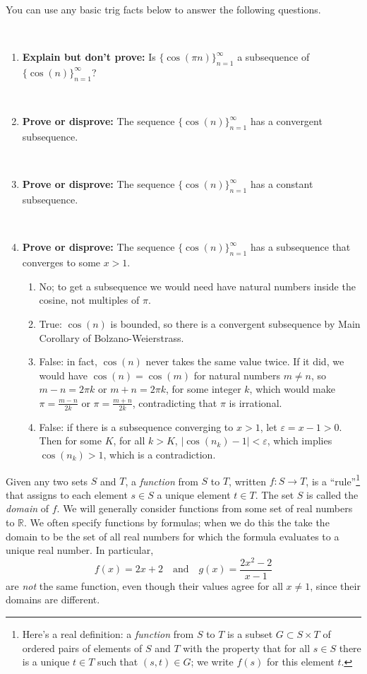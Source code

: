 \documentclass[12pt]{amsart}
\def\e{\varepsilon}
\newcommand{\R}{{\mathbb{R}}}
\numberwithin{equation}{section}
\theoremstyle{plain} %
\theoremstyle{definition}
\theoremstyle{remark}
\begin{document}
You can use any basic trig facts below to answer the following questions. 

\

\begin{enumerate}
\item \textbf{Explain but don't prove:} Is $\{ \cos( \pi n) \}_{n=1}^\infty$ a subsequence of $\{ \cos(n) \}_{n=1}^\infty$?

\

\item \textbf{Prove or disprove:} The sequence $\{ \cos(n) \}_{n=1}^\infty$ has a convergent subsequence.

\

\item \textbf{Prove or disprove:} The sequence $\{ \cos(n) \}_{n=1}^\infty$ has a constant subsequence.

\

\item \textbf{Prove or disprove:} The sequence $\{ \cos(n) \}_{n=1}^\infty$ has a subsequence that converges to some $x>1$.

\begin{framed}
\begin{enumerate}
\item No; to get a subsequence we would need have natural numbers inside the cosine, not multiples of $\pi$.
\item True: $\cos(n)$ is bounded, so there is a convergent subsequence by Main Corollary of Bolzano-Weierstrass.
\item False: in fact, $\cos(n)$ never takes the same value twice. If it did, we would have $\cos(n)=\cos(m)$ for natural numbers $m\neq n$, so $m-n= 2\pi k$ or $m+n= 2\pi k$, for some integer $k$, which would make $\pi = \frac{m-n}{2k}$ or $\pi = \frac{m+n}{2k}$, contradicting that $\pi$ is irrational.
\item False: if there is a subsequence converging to $x>1$, let $\e= x-1 >0$. Then for some $K$, for all $k>K$, $|\cos(n_k) -1|<\e$, which implies $\cos(n_k) >1$, which is a contradiction.
\end{enumerate}
\end{framed}
\end{enumerate}

	
Given any two sets $S$ and $T$, a \emph{function} from $S$ to $T$, written $f: S\to T$, is a ``rule''\footnote{Here's a real definition: a \emph{function} from $S$ to $T$ is a subset $G\subset S\times T$ of ordered pairs of elements of $S$ and $T$ with the property that for all $s\in S$ there is a unique $t \in T$ such that $(s,t)\in G$; we write $f(s)$ for this element $t$.} 
that assigns to each element $s\in S$ a unique element $t\in T$. The set $S$ is called the \emph{domain} of $f$. We will generally consider functions from some set of real numbers to $\R$.
We often specify functions by formulas; when we do this the take the domain to be the set of all real numbers for which the formula evaluates to a unique real number. In particular,
\[ f(x) = 2x+2 \quad \text{and} \quad g(x) = \frac{2x^2-2}{x-1}\]
are \emph{not} the same function, even though their values agree for all $x\neq 1$, since their domains are different.
	
\end{document}
